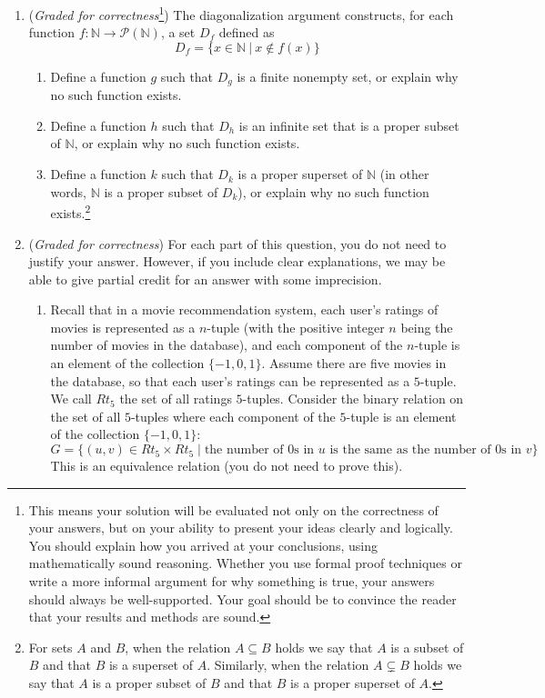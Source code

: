 \begin{enumerate}
    \item ({\it Graded for correctness}\footnote{This means your solution will be
    evaluated not only on the correctness of your answers, but on your ability to 
    present your ideas clearly and logically. You should explain how you arrived at 
    your conclusions, using 
    mathematically sound reasoning. Whether you use formal proof techniques or 
    write a more informal argument for why 
    something is true, your answers should always be well-supported. Your goal 
    should be to convince the reader that 
    your results and methods are sound.})
    The diagonalization argument constructs, for each function 
    $f: \mathbb{N} \to \mathcal{P}(\mathbb{N})$, a set $D_f$ defined as
    \[
    D_f = \{ x \in \mathbb{N} ~|~ x \notin f(x) \}
    \]
    \begin{enumerate}
        \item Define a function $g$ such that $D_g$ is a finite nonempty set, 
        or explain why no such function exists.
        \item Define a function $h$ such that $D_h$ is an infinite set that is a proper subset of 
        $\mathbb{N}$, or explain why no such function exists.
        \item Define a function $k$ such that $D_k$ is a proper superset
        of $\mathbb{N}$ (in other words, $\mathbb{N}$ is a proper subset 
        of $D_k$), or explain why no such function exists.\footnote{
        For sets $A$ and $B$, when the relation $A\subseteq B$ holds we say that $A$ 
        is a subset of $B$ and that $B$ is a superset of $A$. Similarly, when the relation 
        $A\subsetneq B$ holds we say that $A$ is a proper subset of $B$ and that $B$ is a 
        proper superset of $A$. 
        }
    \end{enumerate}    
    
    \item ({\it Graded for correctness}) For each part of this question, you do not need to justify your answer.  
    However, if you include clear explanations, 
    we may be able to give partial credit for an answer with some imprecision.
        
    \begin{enumerate}
    \item Recall that 
    in a movie recommendation system, each 
    user's ratings of movies is represented as a $n$-tuple (with the positive integer $n$ 
    being the number of movies in the database), and each component of 
    the $n$-tuple is an element of the collection $\{-1,0,1\}$. Assume there are five movies in the database, 
    so that each user's ratings
    can be represented as a $5$-tuple. We call $Rt_5$ the set of all ratings $5$-tuples.
    Consider the binary relation on the  set of all 
    $5$-tuples where each  component of the $5$-tuple is an element of the collection $\{-1,0,1\}$:
    \[
        G = \{ (u,v) \in Rt_5 \times Rt_5 \mid \text{the number of $0$s in $u$ is the same as the number of $0$s in $v$} \}
    \]
    This is an equivalence relation (you do not need to prove this).


\end{enumerate}
\end{enumerate}

